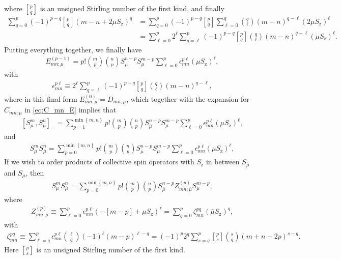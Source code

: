 \documentclass[pra,reprint,longbibliography]{revtex4-1}
\newcommand{\p}[1]{\left(#1\right)} %
\renewcommand{\sp}[1]{\left[#1\right]} %
\renewcommand{\set}[1]{\left\{#1\right\}} %
\newcommand{\z}{\text{z}}
\newcommand{\bmu}{{\bar\mu}}
\newcommand{\1}{\mathds{1}}
\begin{document}
where ${ p \brack q }$ is an unsigned Stirling number of the first
kind, and finally
\begin{align}
  \sum_{q=0}^p \p{-1}^{p-q} { p \brack q } \p{m-n+2\mu S_\z}^q
  &= \sum_{q=0}^p \p{-1}^{p-q} { p \brack q } \sum_{\ell=0}^q
  { q \choose \ell } \p{m-n}^{q-\ell} \p{2\mu S_\z}^\ell \\
  &= \sum_{\ell=0}^p 2^\ell \sum_{q=\ell}^p \p{-1}^{p-q}
  { p \brack q } { q \choose \ell } \p{m-n}^{q-\ell} \p{\mu S_\z}^\ell.
\end{align}
Putting everything together, we finally have
\begin{align}
  E_{mn;\mu}^{(p-1)}
  = p! { m \choose p } { n \choose p }
  S_\bmu^{n-p} S_\mu^{m-p}
  \sum_{\ell=0}^p \epsilon_{mn}^{p\ell} \p{\mu S_\z}^\ell,
\end{align}
with
\begin{align}
  \epsilon_{mn}^{p\ell}
  \equiv 2^\ell \sum_{q=\ell}^p \p{-1}^{p-q}
  { p \brack q } { q \choose \ell } \p{m-n}^{q-\ell},
\end{align}
where in this final form $E_{mn;\mu}^{(0)} = D_{mn;\mu}$, which
together with the expansion for $C_{mn;\mu}$ in \eqref{eq:C_mn_E}
implies that
\begin{align}
  \sp{S_\mu^m, S_\bmu^n}_-
  = \sum_{p=1}^{\min\set{m,n}}
  p! { m \choose p } { n \choose p } S_\bmu^{n-p} S_\mu^{m-p}
  \sum_{\ell=0}^p \epsilon_{mn}^{p\ell} \p{\mu S_\z}^\ell,
  \label{eq:comm_mu}
\end{align}
and
\begin{align}
  S_\mu^m S_\bmu^n
  = \sum_{p=0}^{\min\set{m,n}}
  p! { m \choose p } { n \choose p } S_\bmu^{n-p} S_\mu^{m-p}
  \sum_{\ell=0}^p \epsilon_{mn}^{p\ell} \p{\mu S_\z}^\ell,
  \label{eq:push_mu_bmu}
\end{align}
If we wish to order products of collective spin operators with $S_\z$
in between $S_\bmu$ and $S_\mu$, then
\begin{align}
  S_\mu^m S_\bmu^n
  = \sum_{p=0}^{\min\set{m,n}} p! { m \choose p } { n \choose p }
  S_\bmu^{n-p} Z_{mn;\bmu}^{(p)} S_\mu^{m-p},
\end{align}
where
\begin{align}
  Z_{mn;\bmu}^{(p)}
  \equiv \sum_{\ell=0}^p \epsilon_{mn}^{p\ell}
  \p{-\sp{m-p} + \mu S_\z}^\ell
  = \sum_{q=0}^p \zeta_{mn}^{pq} \p{\bmu S_\z}^q,
  \label{eq:Z_mnp}
\end{align}
with
\begin{align}
  \zeta_{mn}^{pq}
  \equiv \sum_{\ell=q}^p \epsilon_{mn}^{p\ell}
  { \ell \choose q } \p{-1}^\ell \p{m-p}^{\ell-q}
  = \p{-1}^p 2^q \sum_{s=q}^p
  { p \brack s } { s \choose q } \p{m+n-2p}^{s-q}.
  \label{eq:zeta_mnpq}
\end{align}
Here ${ p \brack s }$ is an unsigned Stirling number of the first
kind.
\end{document}
